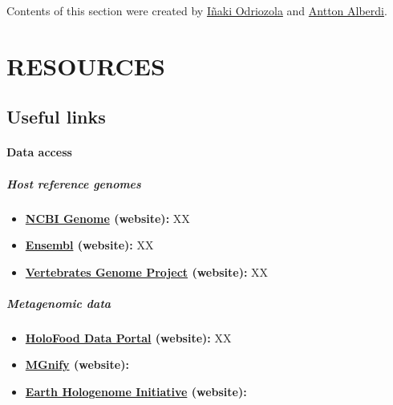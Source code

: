 \documentclass[
]{book}
\providecommand{\tightlist}{%
  \setlength{\itemsep}{0pt}\setlength{\parskip}{0pt}}
\begin{document}
Contents of this section were created by \protect\hyperlink{inaki-odriozola}{Iñaki Odriozola} and \protect\hyperlink{antton-alberdi}{Antton Alberdi}.

\hypertarget{part-resources}{%
\part{RESOURCES}\label{part-resources}}

\hypertarget{useful-links}{%
\chapter{Useful links}\label{useful-links}}

\hypertarget{links-data}{%
\subsection{Data access}\label{links-data}}

\hypertarget{host-reference-genomes}{%
\subsubsection*{Host reference genomes}\label{host-reference-genomes}}

\begin{itemize}
\tightlist
\item
  \textbf{\href{https://www.ncbi.nlm.nih.gov/genome/}{NCBI Genome} (website):} XX
\item
  \textbf{\href{https://www.ensembl.org/index.html}{Ensembl} (website):} XX
\item
  \textbf{\href{https://vertebrategenomesproject.org/}{Vertebrates Genome Project} (website):} XX
\end{itemize}

\hypertarget{metagenomic-data}{%
\subsubsection*{Metagenomic data}\label{metagenomic-data}}

\begin{itemize}
\tightlist
\item
  \textbf{\href{https://www.holofooddata.org/}{HoloFood Data Portal} (website):} XX
\item
  \textbf{\href{https://www.ebi.ac.uk/metagenomics/}{MGnify} (website):}
\item
  \textbf{\href{http://www.earthhologenome.org/database.html}{Earth Hologenome Initiative} (website):}
\end{itemize}
\end{document}
